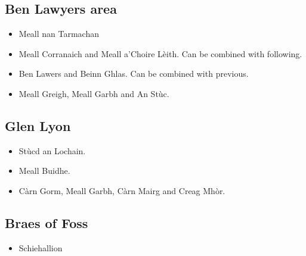 

\subsection{Ben Lawyers area}

\begin{itemize}
\item Meall nan Tarmachan

\item Meall Corranaich and Meall a'Choire Lèith.  Can be combined with
  following. 

\item Ben Lawers and Beinn Ghlas.  Can be combined with previous. 

\item Meall Greigh, Meall Garbh and An Stùc.
\end{itemize}

\subsection{Glen Lyon}

\begin{itemize}
\item
Stùcd an Lochain.

\item
Meall Buidhe.

\item
Càrn Gorm, Meall Garbh, Càrn Mairg and Creag Mhòr.

\end{itemize}


\subsection{Braes of Foss}

\begin{itemize}
\item
Schiehallion
\end{itemize}
